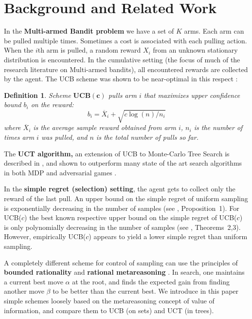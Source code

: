 \documentclass[letterpaper]{article}
\newtheorem{dfn}{Definition}
\begin{document}
\section{Background and Related Work}
\label{sec:related-work}

In the {\bf Multi-armed Bandit problem} \cite{Vermorel.bandits} we have a set
of $K$ arms. Each arm can
be pulled multiple times. Sometimes a cost is
associated with each pulling action. When the $i$th arm
is pulled, a random reward $X_i$ from an unknown stationary
distribution is encountered.
In the cumulative setting (the focus of much of the research literature on Multi-armed bandits),
all encountered rewards are collected by the agent. 
The UCB scheme was shown to be near-optimal in this respect \cite{Auer.ucb}:

\begin{dfn} Scheme $\mathbf{UCB(c)}$ pulls arm $i$ that maximizes 
upper confidence bound $b_i$ on the reward:
\begin{equation}
b_i=\overline X_i+\sqrt {{c \log (n)} / {n_i}}
\label{eqn:ucb}
\end{equation}
where $\overline X_i$ is the average sample reward obtained from arm $i$,
$n_i$ is the number of times arm $i$ was pulled, and $n$ is the total
number of pulls so far. \end{dfn} 

The {\bf UCT algorithm,} an extension of UCB
to Monte-Carlo Tree Search is described in \cite{Kocsis.uct}, and
shown to outperform many state of the art search algorithms in both
MDP and adversarial games \cite{Eyerich.ctp,GellyWang.mogo}. 

In the {\bf simple regret (selection) setting}, the agent gets to
collect only the reward of the last pull. An upper bound on the simple
regret of uniform sampling is exponentially decreasing in the number
of samples (see \cite{Bubeck.pure}, Proposition~1). For UCB($c$) the
best known respective upper bound on the simple regret of UCB($c$) is
only polynomially decreasing in the number of samples (see
\cite{Bubeck.pure}, Theorems~2,3). However, empirically UCB($c$)
appears to yield a lower simple regret than uniform sampling.

A completely different scheme for control of sampling can use the
principles of {\bf bounded rationality} \cite{Horvitz.reasoningabout}
and {\bf rational metareasoning} \cite{Russell.right}. In search, one
maintains a current best move $\alpha $ at the root, and finds the
expected gain from finding another move $\beta $ to be better than the
current best. We introduce in this paper simple
schemes loosely based on the metareasoning concept of value of
information, and compare them to UCB (on sets) and UCT (in trees).
\end{document}
